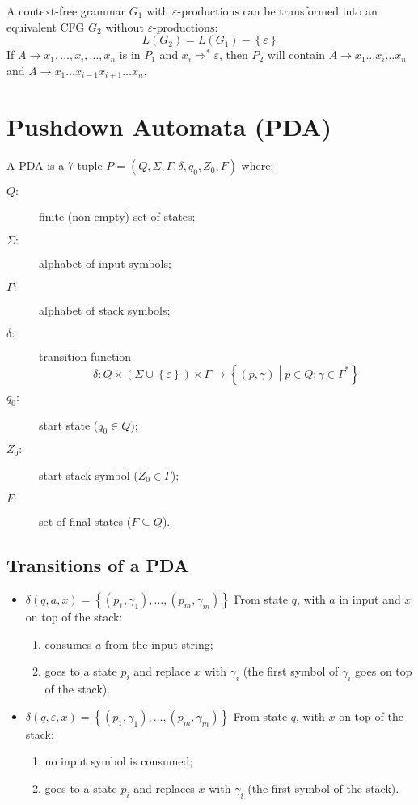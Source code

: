A context-free grammar $G_1$ with $\varepsilon\text{-productions}$ can be transformed into an equivalent CFG $G_2$ without $\varepsilon\text{-productions}$:
$$
    L(G_2) = L(G_1) - \left\{\varepsilon\right\}
$$
If $A \to x_1, \ldots, x_i, \ldots, x_n$ is in $P_1$ and $x_i \Rightarrow^\ast \varepsilon$, then $P_2$ will contain $A \to x_1 \ldots x_i \ldots x_n$ and $A \to x_1 \ldots x_{i - 1} x_{i + 1} \ldots x_n$.

\section{Pushdown Automata (PDA)}
A PDA is a 7-tuple $P = (Q, \Sigma, \Gamma, \delta, q_0, Z_0, F)$ where:
\begin{description}
    \item[$Q:$] finite (non-empty) set of states;
    \item[$\Sigma:$] alphabet of input symbols;
    \item[$\Gamma:$] alphabet of stack symbols;
    \item[$\delta:$] transition function
    $$
        \delta: Q \times (\Sigma \cup \left\{\varepsilon\right\}) \times \Gamma \to \left\{(p, \gamma) \middle| p \in Q; \gamma \in \Gamma^\ast \right\}
    $$
    \item[$q_0:$] start state ($q_0 \in Q$);
    \item[$Z_0:$] start stack symbol ($Z_0 \in \Gamma$);
    \item[$F:$] set of final states ($F \subseteq Q$).
\end{description}

\subsection{Transitions of a PDA}
\begin{itemize}
    \item $\delta(q,a,x) = \left\{(p_1, \gamma_1), \ldots, (p_m, \gamma_m)\right\}$
    From state $q$, with $a$ in input and $x$ on top of the stack:
    \begin{enumerate}
        \item consumes $a$ from the input string;
        \item goes to a state $p_i$ and replace $x$ with $\gamma_i$ (the first symbol of $\gamma_i$ goes on top of the stack).
    \end{enumerate}
    \item $\delta(q,\varepsilon,x) = \left\{(p_1, \gamma_1), \ldots, (p_m, \gamma_m)\right\}$
    From state $q$, with $x$ on top of the stack:
    \begin{enumerate}
        \item no input symbol is consumed;
        \item goes to a state $p_i$ and replaces $x$ with $\gamma_i$ (the first symbol of the stack).
    \end{enumerate}
\end{itemize}

